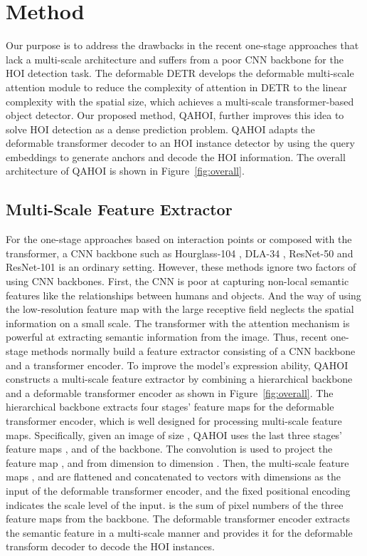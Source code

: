 \documentclass[10pt,twocolumn,letterpaper]{article}
\begin{document}
\section{Method}
Our purpose is to address the drawbacks in the recent one-stage approaches that lack a multi-scale architecture and suffers from a poor CNN backbone for the HOI detection task.
The deformable DETR \cite{zhu2020deformable} develops the deformable multi-scale attention module to reduce the complexity of attention in DETR to the linear complexity with the spatial size, which achieves a multi-scale transformer-based object detector.
Our proposed method, QAHOI, further improves this idea to solve HOI detection as a dense prediction problem.
QAHOI adapts the deformable transformer decoder to an HOI instance detector by using the query embeddings to generate anchors and decode the HOI information.
The overall architecture of QAHOI is shown in Figure~\ref{fig:overall}.

\subsection{Multi-Scale Feature Extractor}
For the one-stage approaches based on interaction points or composed with the transformer, a CNN backbone such as Hourglass-104
\cite{newell2016stacked}, DLA-34 \cite{yu2018deep},
ResNet-50 and ResNet-101 \cite{he2016deep} is an ordinary setting. However, these methods ignore two factors of using CNN backbones.
First, the CNN is poor at capturing non-local semantic features like the relationships between humans and objects.
And the way of using the low-resolution feature map with the large receptive field neglects the spatial information on a small scale.
The transformer with the attention mechanism is powerful at extracting semantic information from the image. Thus, recent one-stage methods
\cite{kim2021hotr,zou2021end,chen2021reformulating,tamura2021qpic} normally build a feature extractor consisting of a CNN backbone and a transformer encoder.
To improve the model's expression ability, QAHOI constructs a multi-scale feature extractor by combining a hierarchical backbone and a deformable transformer encoder
\cite{zhu2020deformable} as shown in Figure~\ref{fig:overall}.
The hierarchical backbone extracts four stages' feature maps for the deformable transformer encoder, which is well designed for processing multi-scale feature maps.
Specifically, given an image of size ,
QAHOI uses the last three stages' feature maps ,
 and  of the backbone.
The  convolution is used to project the feature map ,  and  from dimension  to dimension .
Then, the multi-scale feature maps ,  and  are flattened and concatenated to  vectors with  dimensions as the input of the deformable transformer encoder, and the fixed positional encoding indicates the scale level of the input.
 is the sum of pixel numbers of the three feature maps from the backbone.
The deformable transformer encoder extracts the semantic feature  in a multi-scale manner and provides it for the deformable transform decoder to decode the HOI instances.
\end{document}
